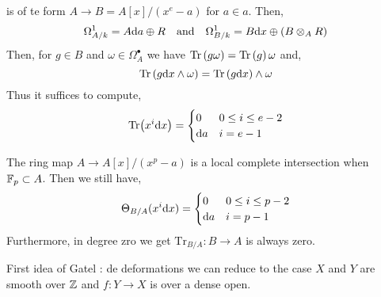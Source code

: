 \documentclass[12pt]{article}
\begin{document}
\begin{remark}
\begin{center}
\end{center}
is of te form $A \to B = A[x] / (x^e - a)$ for $a \in a$. Then,
\[ \Omega^1_{A / k} = A \mathrm{d} a \oplus R \quad \text{and} \quad \Omega^1_{B / k} = B \mathrm{d} x \oplus (B \otimes_A R) \]
Then, for $g \in B$ and $\omega \in \Omega^\bullet_A$ we have $\mathrm{Tr}\left( g \omega \right) = \mathrm{Tr}\left( g \right) \omega$ and,
\[ \mathrm{Tr}\left( g \mathrm{d} x \wedge \omega \right) = \mathrm{Tr}\left( g \mathrm{d} x \right) \wedge \omega \]
Thus it suffices to compute,
\[ \mathrm{Tr} \! \left(x^i \mathrm{d} x\right) = 
\begin{cases}
0 & 0 \le i \le e - 2 
\\
\mathrm{d} a & i = e - 1
\end{cases} \]
\end{remark}

\begin{remark}
The ring map $A \to A[x] / (x^p - a)$ is a local complete intersection when $\mathbb{F}_{p} \subset A$. Then we still have,
\[ \Theta_{B / A}(x^i \mathrm{d} x) =
\begin{cases}
0 & 0 \le i \le p - 2
\\
\mathrm{d} a & i = p - 1
\end{cases} \]
Furthermore, in degree zro we get $\mathrm{Tr}_{B/A} : B \to A$ is always zero.
\end{remark}

\begin{remark}
First idea of Gatel : de deformations we can reduce to the case $X$ and $Y$ are smooth over $\mathbb{Z}$ and $f : Y \to X$ is \etale over a dense open. 
\end{remark}
\end{document}
